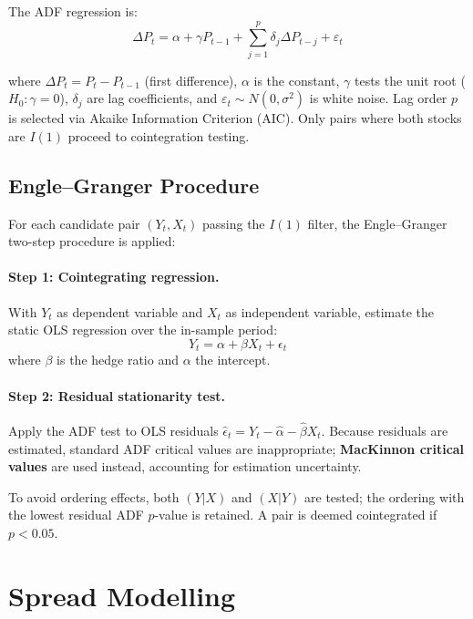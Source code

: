 \documentclass[a4paper]{report}
\begin{document}
The ADF regression is: 
\begin{equation}
\Delta P_t = \alpha + \gamma P_{t-1} + \sum_{j=1}^{p} \delta_j \Delta P_{t-j} + \varepsilon_t 
\end{equation}

where $\Delta P_t = P_t - P_{t-1}$ (first difference), $\alpha$ is the constant, $\gamma$ tests the unit root ($H_0: \gamma = 0$), $\delta_j$ are lag coefficients, and $\varepsilon_t \sim N(0,\sigma^2)$ is white noise. Lag order $p$ is selected via Akaike Information Criterion (AIC). Only pairs where both stocks are $I(1)$ proceed to cointegration testing. 

\subsection{Engle--Granger Procedure}

For each candidate pair $(Y_t, X_t)$ passing the $I(1)$ filter, the Engle--Granger two-step procedure \cite{englegranger1987} is applied:

\paragraph{Step 1: Cointegrating regression.} With $Y_t$ as dependent variable and $X_t$ as independent variable, estimate the static OLS regression over the in-sample period:
\begin{equation}
Y_t = \alpha + \beta X_t + \epsilon_t \label{eq:coint_regression}
\end{equation}
where $\beta$ is the hedge ratio and $\alpha$ the intercept.

\paragraph{Step 2: Residual stationarity test.} Apply the ADF test to OLS residuals $\hat{\epsilon}_t = Y_t - \hat{\alpha} - \hat{\beta} X_t$. Because residuals are estimated, standard ADF critical values are inappropriate; \textbf{MacKinnon critical values} \cite{mackinnon2010} are used instead, accounting for estimation uncertainty.

To avoid ordering effects, both $(Y|X)$ and $(X|Y)$ are tested; the ordering with the lowest residual ADF $p$-value is retained. A pair is deemed cointegrated if $p < 0.05$.

\section{Spread Modelling}
\label{sec:spread_modelling}
\end{document}
